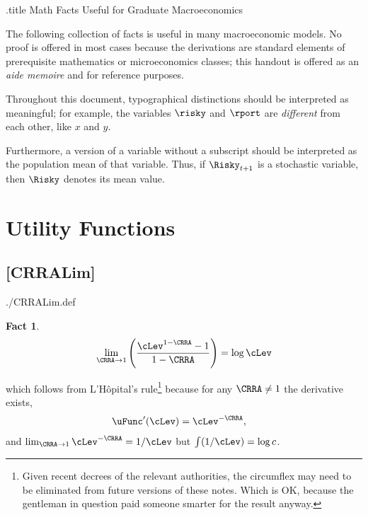 \documentclass{handout}
\newtheorem{Fact}{Fact}
\begin{document}
\handoutHeader


\begin{verbatimwrite}{\jobname.title}
Math Facts Useful for Graduate Macroeconomics
\end{verbatimwrite}

\handoutNameMake 

The following collection of facts is useful in many macroeconomic
models.  No proof is offered in most cases because the derivations
are standard elements of prerequisite mathematics or microeconomics classes;
this handout is offered as an {\it aide memoire} and for reference purposes.

Throughout this document, typographical distinctions should be interpreted as 
meaningful; for example, the variables $\risky$ and $\rport$ are {\it different} from 
each other, like $x$ and $y$.

Furthermore, a version of a variable without a subscript should be interpreted as 
the population mean of that variable.  Thus, if $\Risky_{t+1}$ is a stochastic
variable, then $\Risky$ denotes its mean value.


\section{{Utility Functions}}


\hypertarget{CRRALim}{}
\subsection{{[CRRALim]}}\label{CRRALim} 

\begin{verbatimwrite}{./CRRALim.def}
\providecommand{\CRRALim}{\href{https://www.econ2.jhu.edu/people/ccarroll/public/LectureNotes/MathFacts/MathFactsList\#CRRALim}{\ensuremath{\mathtt{[CRRALim]}}}}
\end{verbatimwrite}

\begin{Fact} \label{fact:CRRALim} 
\begin{equation}
\lim_{\CRRA \rightarrow 1} \left(\frac{\cLev^{1-\CRRA}-1}{1-\CRRA}\right) = \log \cLev
\end{equation}
\end{Fact}
\noindent which follows from L'H\^{o}pital's rule\footnote{Given recent decrees of the relevant authorities, the circumflex may need to be eliminated from future versions of these notes.  Which is OK, because the gentleman in question paid someone smarter for the result anyway.}  because for any $\CRRA \neq 1$ the derivative exists,
\begin{equation}\begin{gathered}\begin{aligned}
  \uFunc^{\prime}(\cLev) & =  \cLev^{-\CRRA},
\end{aligned}\end{gathered}\end{equation}
and $\lim_{\CRRA \rightarrow 1} \cLev^{-\CRRA} = 1/\cLev$ but $\int (1/\cLev) = \log c$.
\end{document}
